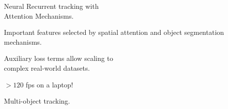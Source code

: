 
\begin{description}[labelsep=1em, leftmargin=!,labelwidth=\widthof{\bfseries Interpretable:}]
    \item[Bio-inspired:] Neural Recurrent tracking with\\ Attention Mechanisms.
    \item[Interpretable:] Important features selected by spatial attention and object segmentation mechanisms.
    \item[Scalable:] Auxiliary loss terms allow scaling to\\ complex real-world datasets.
    \item[Efficient:] $> 120$ fps on a laptop! 
    \item[Future Work:] Multi-object tracking.
\end{description}